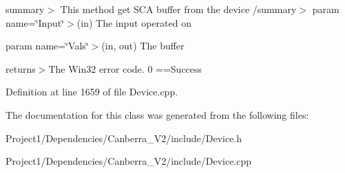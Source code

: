 summary$>$ This method get S\+CA buffer from the device /summary$>$ param name=\char`\"{}\+Input\char`\"{}$>$(in) The input operated on

param name=\char`\"{}\+Vals\char`\"{}$>$(in, out) The buffer

returns$>$The Win32 error code. 0 ==Success

Definition at line 1659 of file Device.\+cpp.



The documentation for this class was generated from the following files\+:\begin{DoxyCompactItemize}
\item 
Project1/\+Dependencies/\+Canberra\+\_\+\+V2/include/Device.\+h\item 
Project1/\+Dependencies/\+Canberra\+\_\+\+V2/include/Device.\+cpp\end{DoxyCompactItemize}
